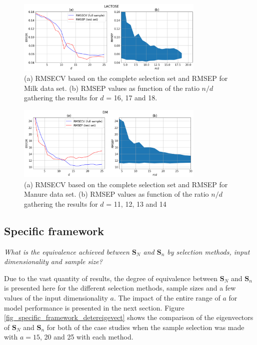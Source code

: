 \documentclass[journal=ancham,manuscript=article]{achemso}
\begin{document}
\begin{figure}[b]
\includegraphics[width=0.8\textwidth]{manuscript/figures/d01_milk_general_framework.png}
\centering
\caption{(a) RMSECV based on the complete selection set and RMSEP for Milk data set. (b) RMSEP values as function of the ratio $n/d$ gathering the results for $d$ = 16, 17 and 18.}
\label{fig_d01_milk_general_framework}
\end{figure}

\begin{figure}[b]
\includegraphics[width=0.8\textwidth]{manuscript/figures/d02_manure_general_framework.png}
\centering
\caption{(a) RMSECV based on the complete selection set and RMSEP for Manure data set. (b) RMSEP values as function of the ratio $n/d$ gathering the results for $d$ = 11, 12, 13 and 14}
\label{fig_d02_manure_general_framework}
\end{figure}

\subsection*{Specific framework}\label{results:specframework}

\emph{What is the equivalence achieved between $\mathbf{S}_N$ and $\mathbf{S}_n$ by selection methods, input dimensionality and sample size?} 

Due to the vast quantity of results, the degree of equivalence between $\mathbf{S}_N$ and $\mathbf{S}_n$ is presented here for the different selection methods, sample sizes and a few values of the input dimensionality $a$. The impact of the entire range of $a$ for model performance is presented in the next section. Figure \ref{fig_specific_framework_detereigevect} shows the comparison of the eigenvectors of $\mathbf{S}_N$ and $\mathbf{S}_n$ for both of the case studies when the sample selection was made with $a=15$, 20 and 25 with each method. 
\end{document}
